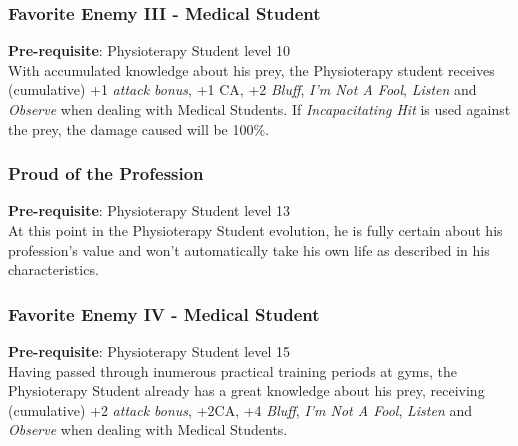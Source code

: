 \documentclass[ letterpaper,12pt]{article}
\begin{document}
\subsubsection{Favorite Enemy III - Medical Student}
 {\bf Pre-requisite}: Physioterapy Student level 10\\
 With accumulated knowledge about his prey, the Physioterapy student receives (cumulative) +1 {\it attack bonus}, +1 CA, +2 {\it Bluff}, {\it I'm Not A Fool}, {\it Listen} and {\it Observe} when dealing with Medical Students. If {\it Incapacitating Hit} is used against the prey, the damage caused will be 100\%.

\subsubsection{Proud of the Profession}
 {\bf Pre-requisite}: Physioterapy Student level 13\\
 At this point in the Physioterapy Student evolution, he is fully certain about his profession's value and won't automatically take his own life as described in his characteristics.

\subsubsection{Favorite Enemy IV - Medical Student}
 {\bf Pre-requisite}: Physioterapy Student level 15\\
 Having passed through inumerous practical training periods at gyms, the Physioterapy Student already has a great knowledge about his prey, receiving (cumulative) +2 {\it attack bonus}, +2CA, +4 {\it Bluff}, {\it I'm Not A Fool}, {\it Listen} and {\it Observe} when dealing with Medical Students.
\end{document}
